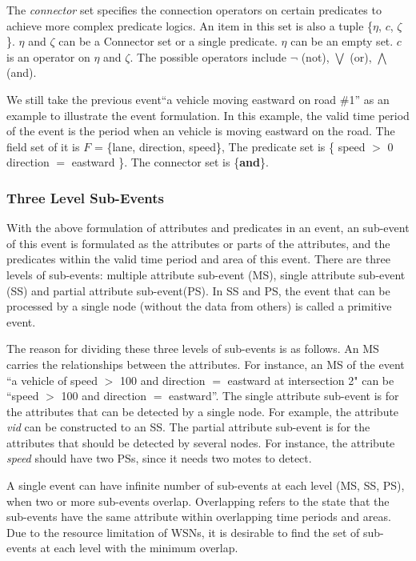 \documentclass[12pt,journal,draftcls,letterpaper,onecolumn]{elsarticle}
\begin{document}
The \emph{connector} set specifies the connection operators on
certain predicates to achieve more complex predicate logics. An item
in this set is also a tuple \{$\eta$, $c$, $\zeta$\}. $\eta$ and
$\zeta$ can be a {Connector} set or a single predicate. $\eta$ can
be an empty set. $c$ is an operator on $\eta$ and $\zeta$. The
possible operators include $\neg$ (not), $\bigvee$ (or), $\bigwedge$
(and).

We still take the previous event``a vehicle moving eastward on road
\#1'' as an example to illustrate the event formulation. In this
example, the valid time period of the event is the period when an
vehicle is moving eastward on the road. The field set of it is $F$ =
\{lane, direction, speed\}, The predicate set is \{ speed $>$ 0\,
direction $=$ eastward \}. The connector set is \{\textbf{and}\}.

\subsubsection{Three Level Sub-Events}

With the above formulation of attributes and predicates in an event,
an sub-event of this event is formulated as the attributes or parts
of the attributes, and the predicates within the valid time period
and area of this event. There are three levels of sub-events:
multiple attribute sub-event (MS), single attribute sub-event (SS)
and partial attribute sub-event(PS). In SS and PS, the event that
can be processed by a single node (without the data from others) is
called a primitive event.

The reason for dividing these three levels of sub-events is as
follows. An MS carries the relationships between the attributes. For
instance, an MS of the event ``a vehicle of speed $>$ 100 and
direction $=$ eastward at intersection 2" can be ``speed $>$ 100 and
direction $=$ eastward''. The single attribute sub-event is for the
attributes that can be detected by a single node. For example, the
attribute \emph{vid} can be constructed to an SS. The partial
attribute sub-event is for the attributes that should be detected by
several nodes. For instance, the attribute \emph{speed} should have
two PSs, since it needs two motes to detect.

A single event can have infinite number of sub-events at each level
(MS, SS, PS), when two or more sub-events overlap. Overlapping
refers to the state that the sub-events have the same attribute
within overlapping time periods and areas. Due to the resource
limitation of WSNs, it is desirable to find the set of sub-events at
each level with the minimum overlap.
\end{document}
